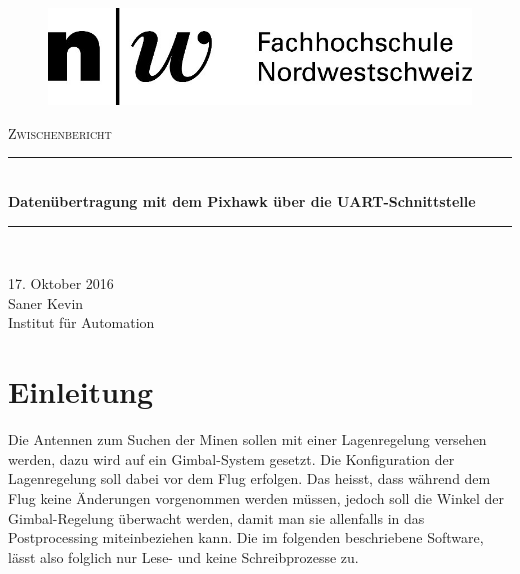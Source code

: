 \documentclass[12pt]{article} %
\begin{document}
	
	\begin{titlepage}
		
		\newcommand{\HRule}{\rule{\linewidth}{0.5mm}} %
		
		\centering %
		
		\begin{figure}[h] 
			\centering
			\includegraphics[width=.4\textwidth]{Logo-FHNW}
		\end{figure}
		
		\textsc{\Large Zwischenbericht}\\[0.5cm] %
		\begin{doublespace}
			\HRule \\[1cm]
			{ \huge \bfseries Datenübertragung mit dem Pixhawk über die UART-Schnittstelle }\\[1cm] %
			\HRule \\[1cm]
		\end{doublespace}

		{\large 17. Oktober 2016}\\[1cm] %
		
		{\large Saner Kevin}\\[1cm]
		{\large Institut für Automation}
		
		\vfill %
		
	\end{titlepage}
	
	\setcounter{page}{1}
	\pagestyle{fancy}
	\rfoot{\thepage}
	
	\section{Einleitung}
	Die Antennen zum Suchen der Minen sollen mit einer Lagenregelung versehen werden, dazu wird auf ein Gimbal-System gesetzt. Die Konfiguration der Lagenregelung soll dabei vor dem Flug erfolgen. Das heisst, dass während dem Flug keine Änderungen vorgenommen werden müssen, jedoch soll die Winkel der Gimbal-Regelung überwacht werden, damit man sie allenfalls in das Postprocessing miteinbeziehen kann. Die im folgenden beschriebene Software, lässt also folglich nur Lese- und keine Schreibprozesse zu.  
\end{document}
